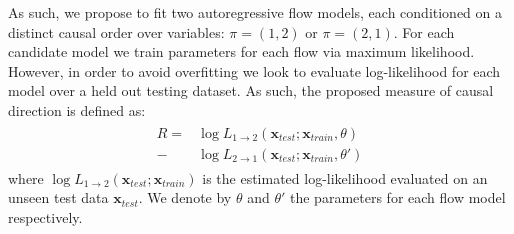 \documentclass{article}
\begin{document}
As such, we propose to fit two 
autoregressive flow models, each conditioned on a 
distinct causal order
over variables: $\pi = (1,2)$ or $\pi=(2,1)$. 
For each candidate model we train parameters for each flow via maximum likelihood. 
However, in order to avoid overfitting we look to evaluate log-likelihood for each model over a 
held out testing dataset. As such, the proposed measure of causal direction is 
defined as:
\begin{align}
\label{eq:flowLR}
\begin{split}
 R = &\log {L_{1\rightarrow 2 }(\mathbf{x}_{test}; \mathbf{x}_{train}, \theta) } \\- &\log { L_{2\rightarrow 1 }(\mathbf{x}_{test}; \mathbf{x}_{train}, \theta') }
\end{split}
\end{align}
where $\log L_{1\rightarrow 2 }(\mathbf{x}_{test}; \mathbf{x}_{train}) $ is the estimated log-likelihood 
evaluated on an unseen test data $\mathbf{x}_{test}$. %
We denote by $\theta$ and $\theta'$ the parameters 
for each flow model respectively. 






\end{document}
